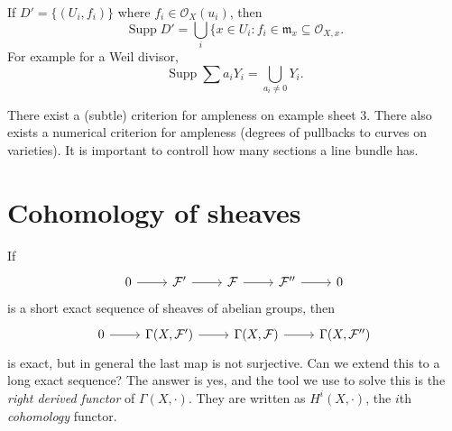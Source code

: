 \documentclass[a4paper]{article}
\newcommand{\sh}[1]{\mathcal{#1}} %
\DeclareMathOperator{\Supp}{Supp} %
\begin{document}
If \(D' = \{(U_i, f_i)\}\) where \(f_i \in \sh O_X(u_i)\), then
\[
  \Supp D' = \bigcup_i \{x \in U_i: f_i \in \mathfrak m_x \subseteq \sh O_{X, x}.
\]
For example for a Weil divisor,
\[
  \Supp \sum a_iY_i = \bigcup_{a_i \neq 0} Y_i.
\]

\begin{remark}
  There exist a (subtle) criterion for ampleness on example sheet 3. There also exists a numerical criterion for ampleness (degrees of pullbacks to curves on varieties). It is important to controll how many sections a line bundle has.
\end{remark}

\section{Cohomology of sheaves}

If
\[
  \begin{tikzcd}
    0 \ar[r] & \sh F' \ar[r] & \sh F \ar[r] & \sh F'' \ar[r] & 0
  \end{tikzcd}
\]
is a short exact sequence of sheaves of abelian groups, then
\[
  \begin{tikzcd}
    0 \ar[r] & \Gamma(X, \sh F') \ar[r] & \Gamma(X, \sh F) \ar[r] & \Gamma(X, \sh F'')
  \end{tikzcd}
\]
is exact, but in general the last map is not surjective. Can we extend this to a long exact sequence? The answer is yes, and the tool we use to solve this is the \emph{right derived functor} of \(\Gamma(X, \cdot)\). They are written as \(H^i(X, \cdot)\), the \(i\)th \emph{cohomology} functor.
\end{document}

